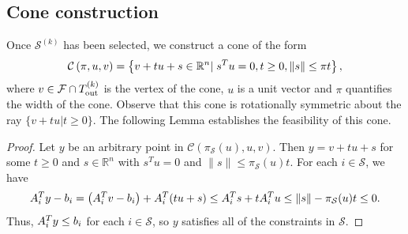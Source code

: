 \documentclass{article}
\newcommand{\real}{\mathbb R}
\begin{document}
\subsection{Cone construction}
\label{cone_construction}

Once $\mathcal{S}^{(k)}$ has been selected,  we construct a cone of the form
\begin{align}\label{define_cone}
\mathcal C\left(\pi, u,v\right) = \left\{v + t u + s \in \mathbb R^n | \; s^Tu= 0, t \ge 0, \|s\| \le \pi t\right\},
\end{align}
where $v \in {\mathcal F} \cap {T_{\text{out}}^{(k)}}$ is the vertex of the cone,  $u$ is a unit vector and $\pi$ quantifies the width of the cone.     Observe that this cone is rotationally symmetric about the ray $\{v+tu | t \ge 0\}$.     The following Lemma establishes the feasibility of this cone.



\begin{proof}
Let $y$ be an arbitrary point in $\mathcal C\left(\pi_{\mathcal S}(u),u,v\right)$.   Then $y = v + tu + s$ for some $t \ge 0$ and $s \in \real^n$ with $s^T u = 0$ and $\|s\| \le \pi_{\mathcal S}(u) t$.    For each $i \in \mathcal S$,  we have
\begin{align*}
{{A}}_{i}^Ty - {{b}}_{i} = \left({{A}}_{i}^Tv -b_i\right) +  {{A}}_{i}^T(tu + s) \le {{A}}_{i}^Ts + t {{A}}_{i}^Tu \le \|s\| - \pi_{\mathcal S}(u) t \le 0.
\end{align*}
Thus, ${{A}}_{i}^T y \le b_i$ for each $i \in \mathcal S$, so $y$ satisfies all of the constraints in $\mathcal S$.
\end{proof}
\end{document}
